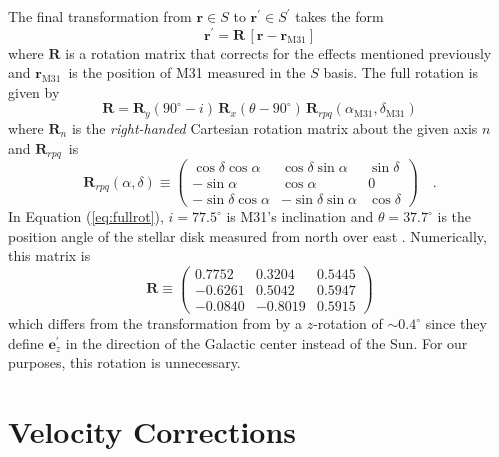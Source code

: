 \documentclass[preprint,12pt]{aastex}
\newcommand{\eqlabel}[1]{\label{eq:#1}}
\newcommand{\eq}[1]{Equation (\ref{eq:#1})}
\newcommand{\applabel}[1]{\label{app:#1}}
\newcommand{\bvec}[1]{\ensuremath{\boldsymbol{#1}}}
\renewcommand{\vector}[1]{\ensuremath{\bvec{#1}}}
\renewcommand{\matrix}[1]{\ensuremath{\bvec{#1}}}
\newcommand{\posand}{\ensuremath{\vector{r}_\mathrm{M31}}}
\newcommand{\R}{\ensuremath{\matrix{R}}}
\newcommand{\Rx}{\ensuremath{\R_x}}
\newcommand{\Ry}{\ensuremath{\R_y}}
\newcommand{\Rrpq}{\ensuremath{\R_{rpq}}}
\begin{document}
The final transformation from $\vector{r} \in S$ to
$\vector{r}^\prime \in S^\prime$ takes the form
\begin{equation}
    \vector{r}^\prime = \R \, [\vector{r} - \posand]
\end{equation}
where $\matrix{R}$ is a rotation matrix that corrects for the effects
mentioned previously and \posand\ is the position of M31 measured in the
$S$ basis. The full rotation is given by
\begin{equation}
    \eqlabel{fullrot}
    \matrix{R} = \Ry (90^\circ - i) \, \Rx (\theta - 90^\circ)
        \, \Rrpq (\alpha_\mathrm{M31}, \delta_\mathrm{M31})
\end{equation}
where $\R_n$ is the \emph{right-handed} Cartesian rotation matrix about the
given axis $n$ and \Rrpq\ is
\begin{equation}
    \eqlabel{triad}
    \Rrpq (\alpha, \delta) \equiv \left ( \begin{array}{ccc}
    \cos \delta \cos \alpha & \cos \delta \sin \alpha & \sin \delta \\
    -\sin \alpha & \cos \alpha & 0 \\
    -\sin \delta \cos \alpha & -\sin \delta \sin \alpha & \cos \delta
    \end{array} \right ) \quad .
\end{equation}
In \eq{fullrot}, $i = 77.5^\circ$ is M31's inclination and
$\theta = 37.7^\circ$ is the position angle of the stellar disk measured
from north over east \citep{de-Vaucouleurs:1958}.  Numerically, this matrix
is
\begin{equation}
    \eqlabel{fullrotation}
    \R \equiv \left ( \begin{array}{ccc}
0.7752 & 0.3204 & 0.5445 \\
-0.6261 & 0.5042 & 0.5947 \\
-0.0840 & -0.8019 & 0.5915
\end{array} \right )
\end{equation}
which differs from the transformation from \citet{Metz:2007} by a
$z$-rotation of $\sim 0.4^\circ$ since they define $\mathbf{e}_z^\prime$
in the direction of the Galactic center instead of the Sun. For our
purposes, this rotation is unnecessary.

\section{Velocity Corrections}

\applabel{vel}
\end{document}
